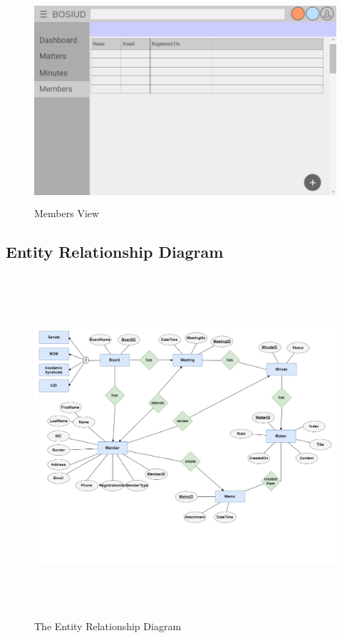 \documentclass[a4paper,beamer]{article}
\begin{document}
		\begin{figure}[h!]
			\begin{center}
			\includegraphics[width=5in,height=3in]{img/ui-members}
			\end{center}
			\caption{Members View}
			\label{fig:ui-members}
		\end{figure}
		
		\clearpage
		\newpage

	\subsection{Entity Relationship Diagram}
		\vspace{2cm}
		\begin{figure}[h]
			\begin{center}
				\includegraphics[width=6in,height=5in]{img/entity-relationship-diagram}
			\end{center}
			\caption{The Entity Relationship Diagram}
			\label{fig:ERD}
		\end{figure}
		\newpage  
	
\end{document}
